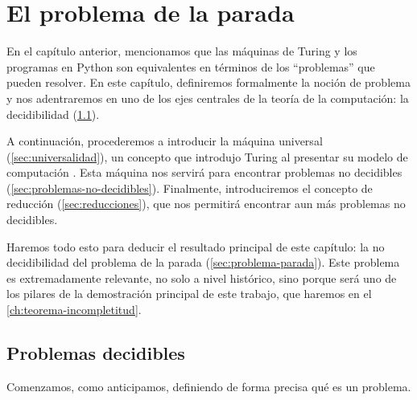 

\chapter{El problema de la parada}\label{ch:problema-parada}

En el capítulo anterior, mencionamos que las máquinas de Turing y los programas en Python son equivalentes en términos de los ``problemas'' que pueden resolver. En este capítulo, definiremos formalmente la noción de problema y nos adentraremos en uno de los ejes centrales de la teoría de la computación: la decidibilidad (\cref{sec:problemas-decidibles}).

A continuación, procederemos a introducir la máquina universal (\cref{sec:universalidad}), un concepto que introdujo Turing al presentar su modelo de computación \cite{Turing1937}. Esta máquina nos servirá para encontrar problemas no decidibles (\cref{sec:problemas-no-decidibles}). Finalmente, introduciremos el concepto de reducción (\cref{sec:reducciones}), que nos permitirá encontrar aun más problemas no decidibles.

Haremos todo esto para deducir el resultado principal de este capítulo: la no decidibilidad del problema de la parada (\cref{sec:problema-parada}). Este problema es extremadamente relevante, no solo a nivel histórico, sino porque será uno de los pilares de la demostración principal de este trabajo, que haremos en el \cref{ch:teorema-incompletitud}.

\section{Problemas decidibles}\label{sec:problemas-decidibles}

Comenzamos, como anticipamos, definiendo de forma precisa qué es un problema. \cite{MacCormick2018,Sipser2012}

